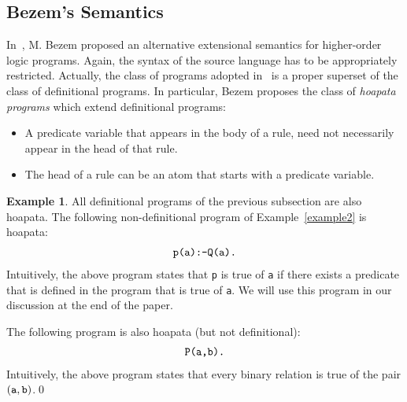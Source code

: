 \documentclass[submission,copyright]{eptcs}
\theoremstyle{definition}
\newtheorem{example}{Example}
\begin{document}
\subsection{Bezem's Semantics}
In~\cite{Bezem99,Bezem01}, M. Bezem proposed an alternative extensional semantics for higher-order
logic programs. Again, the syntax of the source language has to be appropriately restricted.
Actually, the class of programs adopted in~\cite{Bezem99,Bezem01} is a proper superset of the
class of definitional programs. In particular, Bezem proposes the class of {\em hoapata programs} which
extend definitional programs:
\begin{itemize}
\item A predicate variable that appears in the body of a rule, need not
      necessarily appear in the head of that rule.

\item The head of a rule can be an atom that starts with a predicate variable.
\end{itemize}
\begin{example}
All definitional programs of the previous subsection are also hoapata.
The following non-definitional program of Example~\ref{example2} is hoapata:
\[
\begin{array}{l}
\mbox{\tt p(a):-Q(a).}
\end{array}
\]
Intuitively, the above program states that {\tt p} is true of {\tt a}
if there exists a predicate that is defined in the program
that is true of {\tt a}. We will use this program
in our discussion at the end of the paper.

The following program is also hoapata (but not definitional):
\[
\begin{array}{l}
\mbox{\tt P(a,b).}
\end{array}
\]
Intuitively, the above program states that every binary relation is
true of the pair $({\tt a},{\tt b})$.\qed
\end{example}
\end{document}

